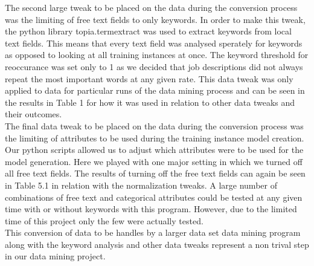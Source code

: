 The second large tweak to be placed on the data during the conversion process was the limiting of free text fields to only 
keywords. In order to make this tweak, the python library topia.termextract was used to extract keywords from local text fields.
This means that every text field was analysed sperately for keywords as opposed to looking at all training instances at once.
The keyword threshold for reoccurance was set only to 1 as we decided that job descriptions did not always repeat the most important
words at any given rate. This data tweak was only applied to data for particular runs of the data mining process and can be seen
in the results in Table 1 for how it was used in relation to other data tweaks and their outcomes.\\

The final data tweak to be placed on the data during the conversion process was the limiting of attributes to be used during 
the training instance model creation. Our python scripts allowed us to adjust which attributes were to be used for the model
generation. Here we played with one major setting in which we turned off all free text fields. The results of turning off
the free text fields can again be seen in Table 5.1 in relation with the normalization tweaks. A large number of combinations
of free text and categorical attributes could be tested at any given time with or without keywords with this program. However,
due to the limited time of this project only the few were actually tested.\\

This conversion of data to be handles by a larger data set data mining program along with the keyword analysis and other
data tweaks represent a non trival step in our data mining project.